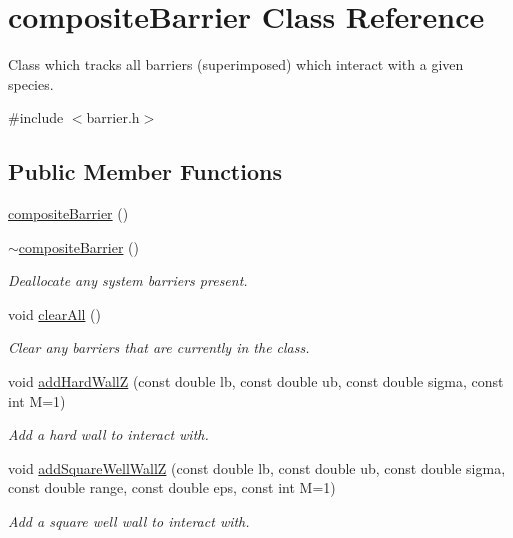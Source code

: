 \hypertarget{classcomposite_barrier}{\section{composite\-Barrier Class Reference}
\label{classcomposite_barrier}
}


Class which tracks all barriers (superimposed) which interact with a given species.  




{\ttfamily \#include $<$barrier.\-h$>$}

\subsection*{Public Member Functions}
\begin{DoxyCompactItemize}
\item 
\hyperlink{classcomposite_barrier_a84b553543dddd5177980f5e5a5616af3}{composite\-Barrier} ()
\item 
\hyperlink{classcomposite_barrier_a1362afbee9253343a95734b10953ccee}{$\sim$composite\-Barrier} ()
\begin{DoxyCompactList}\small\item\em Deallocate any system barriers present. \end{DoxyCompactList}\item 
void \hyperlink{classcomposite_barrier_a9b40ae6dd65d5f92d8dc8b63301e14f6}{clear\-All} ()
\begin{DoxyCompactList}\small\item\em Clear any barriers that are currently in the class. \end{DoxyCompactList}\item 
void \hyperlink{classcomposite_barrier_a10e7f2561e3b5167b69ead011dde2e75}{add\-Hard\-Wall\-Z} (const double lb, const double ub, const double sigma, const int M=1)
\begin{DoxyCompactList}\small\item\em Add a hard wall to interact with. \end{DoxyCompactList}\item 
void \hyperlink{classcomposite_barrier_a3cb5df17c75d9ff8ccc44b806871b449}{add\-Square\-Well\-Wall\-Z} (const double lb, const double ub, const double sigma, const double range, const double eps, const int M=1)
\begin{DoxyCompactList}\small\item\em Add a square well wall to interact with. \end{DoxyCompactList}\item 

\end{DoxyCompactItemize}
